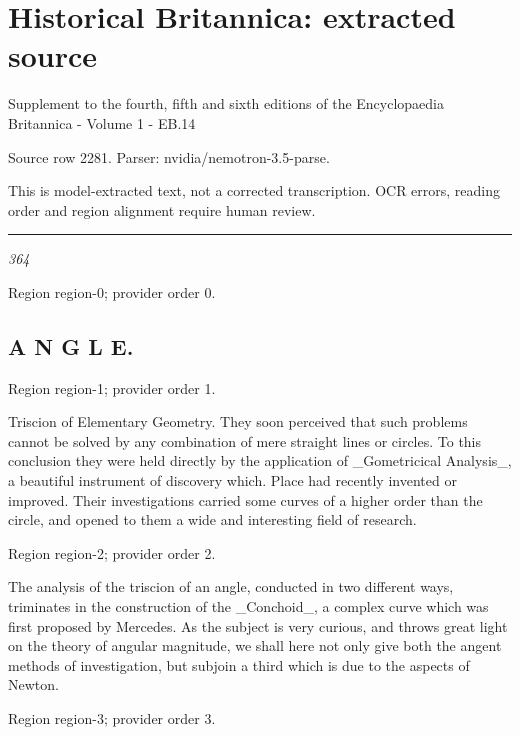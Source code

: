\documentclass[11pt]{article}
\begin{document}
\section*{Historical Britannica: extracted source}
Supplement to the fourth, fifth and sixth editions of the Encyclopaedia Britannica - Volume 1 - EB.14\par
{\small Source row 2281. Parser: nvidia/nemotron-3.5-parse.\par}
{\small This is model-extracted text, not a corrected transcription. OCR errors, reading order and region alignment require human review.\par}
\hrule\medskip
{\small\itshape 364\par}

{\scriptsize\color{gray} Region region-0; provider order 0.\par}
\medskip

\subsection*{A N G L E.}

{\scriptsize\color{gray} Region region-1; provider order 1.\par}
\medskip

Triscion of Elementary Geometry. They soon perceived that such problems cannot be solved by any combination of mere straight lines or circles. To this conclusion they were held directly by the application of \_Gometricical Analysis\_, a beautiful instrument of discovery which. Place had recently invented or improved. Their investigations carried some curves of a higher order than the circle, and opened to them a wide and interesting field of research.
\par

{\scriptsize\color{gray} Region region-2; provider order 2.\par}
\medskip

The analysis of the triscion of an angle, conducted in two different ways, triminates in the construction of the \_Conchoid\_, a complex curve which was first proposed by Mercedes. As the subject is very curious, and throws great light on the theory of angular magnitude, we shall here not only give both the angent methods of investigation, but subjoin a third which is due to the aspects of Newton.
\par

{\scriptsize\color{gray} Region region-3; provider order 3.\par}
\medskip
\end{document}
